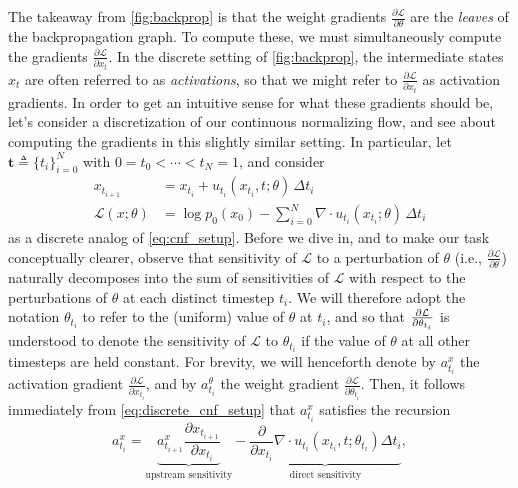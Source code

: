 \documentclass{scrartcl}
\begin{document}
The takeaway from \cref{fig:backprop} is that the weight gradients $\frac{\partial \mathcal{L}}{\partial \theta}$ are the \textit{leaves} of the backpropagation graph. 
To compute these, we must simultaneously compute the gradients $\frac{\partial \mathcal{L}}{\partial x_t}$. 
In the discrete setting of \cref{fig:backprop}, the intermediate states $x_t$ are often referred to as \textit{activations}, so that we might refer to $\frac{\partial \mathcal{L}}{\partial x_t}$ as activation gradients. 
In order to get an intuitive sense for what these gradients should be, let's consider a discretization of our continuous normalizing flow, and see about computing the gradients in this slightly similar setting. 
In particular, let $\mathbf{t} \triangleq \{t_i\}_{i=0}^N$ with $0 = t_0 < \cdots < t_N = 1$, and consider 
\begin{equation}
    \begin{aligned}
    x_{t_{i+1}} &= x_{t_i} + u_{t_i}(x_{t_i},t;\theta)\, \Delta t_i\\
    \mathcal{L}(x;\theta) &= \log p_0(x_0) - \sum_{i=0}^N \nabla \cdot u_{t_i}(x_{t_i}; \theta)\, \Delta t_i
    \end{aligned}
    \label{eq:discrete_cnf_setup}
\end{equation}
as a discrete analog of \cref{eq:cnf_setup}. Before we dive in, and to make our task conceptually clearer, observe that sensitivity of $\mathcal{L}$ to a perturbation of $\theta$ (i.e., $\frac{\partial \mathcal{L}}{\partial \theta}$) naturally decomposes into the sum of sensitivities of $\mathcal{L}$ with respect to the perturbations of $\theta$ at each distinct timestep $t_i$. We will therefore adopt the notation $\theta_{t_i}$ to refer to the (uniform) value of $\theta$ at $t_i$, and so that $\pdv{\mathcal{L}}{\theta_{t_i}}$ is understood to denote the sensitivity of $\mathcal{L}$ to $\theta_{t_i}$ if the value of $\theta$ at all other timesteps are held constant.
For brevity, we will henceforth denote by $a^x_{t_i}$ the activation gradient $\frac{\partial \mathcal{L}}{\partial x_{t_i}}$, and by $a^\theta_{t_i}$ the weight gradient $\frac{\partial \mathcal{L}}{\partial \theta_{t_i}}$. Then, it follows immediately from \cref{eq:discrete_cnf_setup} that $a^x_{t_i}$ satisfies the recursion
\begin{equation*}
a^x_{t_i} = \underbrace{a^x_{t_{i+1}} \frac{\partial x_{t_{i+1}}}{\partial x_{t_i}}}_{\text{upstream sensitivity}} - \underbrace{\frac{\partial}{\partial x_{t_i}} \nabla \cdot u_{t_i}(x_{t_i},t;\theta_{t_i}) \Delta t_i}_{\text{direct sensitivity}},
\end{equation*}
\end{document}
